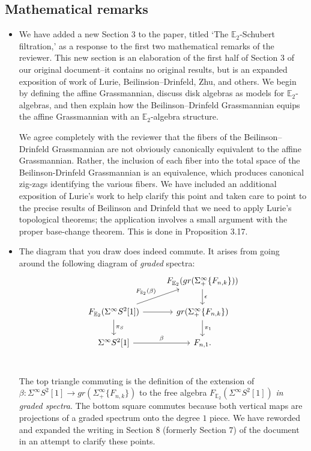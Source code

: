 \documentclass[reqno, oneside]{amsart}
\theoremstyle{definition}
\theoremstyle{plain}
\DeclareMathOperator{\E}{\mathbb{E}}
\begin{document}
\subsection{Mathematical remarks}



\begin{itemize}

\item We have added a new Section $3$ to the paper, titled `The $\mathbb{E}_2$-Schubert filtration,' as a response to the first two mathematical remarks of the reviewer.  This new section is an elaboration of the first half of Section $3$ of our original document--it contains no original results, but is an expanded exposition of work of Lurie, Beilinsion--Drinfeld, Zhu, and others.  We begin by defining the affine Grassmannian, discuss disk algebras as models for $\mathbb{E}_2$-algebras, and then explain how the Beilinson--Drinfeld Grassmannian equips the affine Grassmannian with an $\mathbb{E}_2$-algebra structure.


We agree completely with the reviewer that the fibers of the Beilinson--Drinfeld Grassmannian are not obviously canonically equivalent to the affine Grassmannian.  Rather, the inclusion of each fiber into the total space of the Beilinson-Drinfeld Grassmannian is an equivalence, which produces canonical zig-zags identifying the various fibers.  We have included an additional exposition of Lurie's work to help clarify this point and taken care to point to the precise results of Beilinson and Drinfeld that we need to apply Lurie's topological theorems; the application involves a small argument with the proper base-change theorem.  This is done in Proposition 3.17.  

\item The diagram that you draw does indeed commute.  It arises from going around the following diagram of \emph{graded} spectra:
$$
\begin{tikzcd}
 & F_{\E_2}( gr(\Sigma^{\infty}_+\{F_{n,k}\}) )\arrow[d,"\epsilon"] \\
F_{\E_2}(\Sigma^{\infty}S^2[1]) \arrow[ru, "F_{\E_2}(\beta)"] \arrow[r]\arrow[d,"\pi_S"] & gr(\Sigma^{\infty}_+ \{ F_{n,k}\} ) \arrow[d,"\pi_1"] \\
\Sigma^{\infty} S^2[1] \arrow[r,"\beta"]& F_{n,1}.\\
\end{tikzcd}
$$

The top triangle commuting is the definition of the extension of $\beta: \Sigma^{\infty}S^2[1] \to gr(\Sigma^{\infty}_+ \{F_{n,k} \} )$ to the free algebra $F_{\E_2} (\Sigma^{\infty} S^2[1])$ \emph{in graded spectra}.  The bottom square commutes because both vertical maps are projections of a graded spectrum onto the degree $1$ piece.  We have reworded and expanded the writing in Section $8$ (formerly Section $7$) of the document in an attempt to clarify these points.


\end{itemize}
\end{document}

